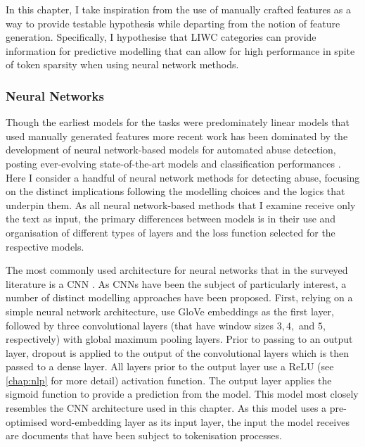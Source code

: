 In this chapter, I take inspiration from the use of manually crafted features as a way to provide testable hypothesis while departing from the notion of feature generation.
Specifically, I hypothesise that LIWC categories can provide information for predictive modelling that can allow for high performance in spite of token sparsity when using neural network methods.

\subsubsection{Neural Networks}\label{sec:LIWC_nn}
Though the earliest models for the tasks were predominately linear models that used manually generated features \citep{Waseem-Hovy:2016,Davidson:2017,Warner:2012} more recent work has been dominated by the development of neural network-based models for automated abuse detection, posting ever-evolving state-of-the-art models and classification performances \citep[e.g.]{Park:2017,Badjatiya:2017,Zimmerman:2018,Stoop:2019,Isaksen:2020}.
Here I consider a handful of neural network methods for detecting abuse, focusing on the distinct implications following the modelling choices and the logics that underpin them.
As all neural network-based methods that I examine receive only the text as input, the primary differences between  models is in their use and organisation of different types of layers and the loss function selected for the respective models.

The most commonly used architecture for neural networks that in the surveyed literature is a CNN \citep{Park:2017,Gamback:2017,Wulczyn:2017,Kolhatkar:2020,Zimmerman:2018,Wang:2020}.
As CNNs have been the subject of particularly interest, a number of distinct modelling approaches have been proposed.
First, relying on a simple neural network architecture, \citet{Kolhatkar:2020} use GloVe embeddings as the first layer, followed by three convolutional layers (that have window sizes $3, 4,$ and $5$, respectively) with global maximum pooling layers.
Prior to passing  to an output layer,  dropout  is applied to the output of the convolutional layers which is then passed to a dense layer.
All layers prior to the output layer use a ReLU (see \cref{chap:nlp} for more detail) activation function.
The output layer applies the sigmoid function to provide a prediction from the model.
This model most closely resembles the CNN architecture used in this chapter.
As this model uses a pre-optimised word-embedding layer as its input layer, the input the model receives are documents that have been subject to tokenisation processes.

